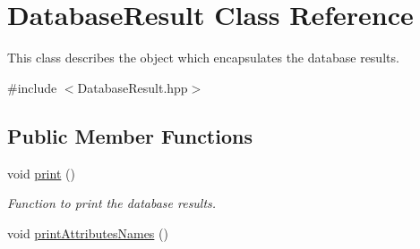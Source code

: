 \hypertarget{classDatabaseResult}{
\section{DatabaseResult Class Reference}
\label{classDatabaseResult}
}


This class describes the object which encapsulates the database results.  




{\ttfamily \#include $<$DatabaseResult.hpp$>$}

\subsection*{Public Member Functions}
\begin{DoxyCompactItemize}
\item 
\hypertarget{classDatabaseResult_a9e90ab72a798d7fa818e7e012931609a}{
void \hyperlink{classDatabaseResult_a9e90ab72a798d7fa818e7e012931609a}{print} ()}
\label{classDatabaseResult_a9e90ab72a798d7fa818e7e012931609a}

\begin{DoxyCompactList}\small\item\em Function to print the database results. \item\end{DoxyCompactList}\item 
\hypertarget{classDatabaseResult_a8804e1de33bcc2423cd6949504d773f4}{
void \hyperlink{classDatabaseResult_a8804e1de33bcc2423cd6949504d773f4}{printAttributesNames} ()}
\label{classDatabaseResult_a8804e1de33bcc2423cd6949504d773f4}


\end{DoxyCompactItemize}
